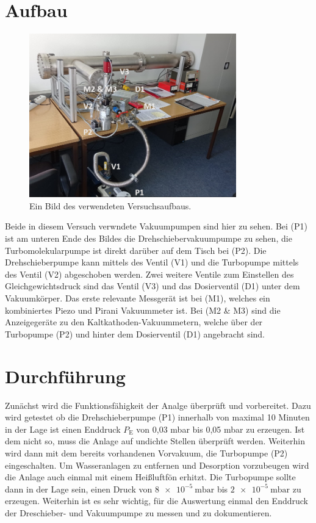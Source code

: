 \section{Aufbau}
		
	\begin{figure}
		\centering
		\includegraphics[width=0.8\textwidth]{"latex/images/Aufbau_beschriftet.png"}
		\caption{Ein Bild des verwendeten Versuchsaufbaus.}
		\label{fig:auf}
	\end{figure}		
	\noindent
	Beide in diesem Versuch verwndete Vakuumpumpen sind hier zu sehen.
	Bei (P1) ist am unteren Ende des Bildes die Drehschiebervakuumpumpe zu sehen, die Turbomolekularpumpe ist direkt darüber auf dem Tisch bei (P2).
	Die Drehschieberpumpe kann mittels des Ventil (V1) und die Turbopumpe mittels des Ventil (V2) abgeschoben werden.
	Zwei weitere Ventile zum Einstellen des Gleichgewichtsdruck sind das Ventil (V3) und das Dosierventil (D1) unter dem Vakuumkörper.
	Das erste relevante Messgerät ist bei (M1), welches ein kombiniertes Piezo und Pirani Vakuummeter ist.
	Bei (M2 \& M3) sind die Anzeigegeräte zu den Kaltkathoden-Vakuummetern, welche über der Turbopumpe (P2) und hinter dem Dosierventil (D1) angebracht sind.

\section{Durchführung}
	Zunächst wird die Funktionsfähigkeit der Analge überprüft und vorbereitet. 
	Dazu wird getestet ob die Drehschieberpumpe (P1) innerhalb von maximal 10 Minuten in der Lage ist einen Enddruck $P_\text{E}$ von 0,03 mbar bis 0,05 mbar zu erzeugen. 
	Ist dem nicht so, muss die Anlage auf undichte Stellen überprüft werden.
	Weiterhin wird dann mit dem bereits vorhandenen Vorvakuum, die Turbopumpe (P2) eingeschalten. 
	Um Wasseranlagen zu entfernen und Desorption vorzubeugen wird die Anlage auch einmal mit einem Heißluftfön erhitzt.
	Die Turbopumpe sollte dann in der Lage sein, einen Druck von $\SI{8 e-5}{\milli\bar}$ bis $\SI{2 e-5}{\milli\bar}$ zu erzeugen.
	Weiterhin ist es sehr wichtig, für die Auswertung einmal den Enddruck der Dreschieber- und Vakuumpumpe zu messen und zu dokumentieren.	


